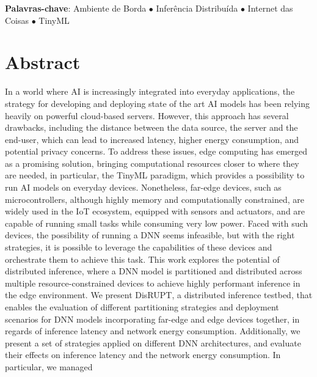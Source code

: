\vspace{\fill}
\begin{flushleft}
{\Large \textbf{Palavras-chave}:} 
Ambiente de Borda \(\bullet\) 
Inferência Distribuída \(\bullet\)
Internet das Coisas \(\bullet\)
TinyML 
\end{flushleft}
\vspace*{24mm}

\acresetall %

\chapter*{Abstract}

In a world where \ac{AI} is increasingly integrated into everyday applications, the 
strategy for developing
and deploying state of the art \ac{AI} models has been relying heavily on powerful 
cloud-based servers. However, this approach has several drawbacks, including the
distance between the data source, the server and the end-user, which can lead to
increased latency, higher energy consumption, and potential privacy concerns.
To address these issues, edge computing has emerged as a promising solution, bringing
computational resources closer to where they are needed, in particular, the TinyML
paradigm, which provides a possibility to run \ac{AI} models on everyday devices.
Nonetheless, far-edge devices, such as microcontrollers, although
highly memory and computationally constrained, are widely used in the \ac{IoT} ecosystem,
equipped with sensors and actuators, and are capable of running small tasks while
consuming very low power. Faced with such devices, the possibility of running a
\ac{DNN} seems infeasible, but with the right strategies, it is possible to leverage
the capabilities of these devices and orchestrate them to achieve this task.
This work explores the potential of distributed inference,
where a \ac{DNN} model is partitioned and distributed across multiple
resource-constrained devices to achieve highly performant inference in the edge 
environment. We present \ac{DisRUPT}, a distributed inference testbed, that enables the
evaluation of different partitioning strategies and deployment scenarios for \ac{DNN} 
models incorporating far-edge and edge devices together, in regards of inference 
latency and network energy consumption. Additionally, we present a set 
of strategies applied on different \ac{DNN} architectures, and evaluate their effects 
on inference latency and the network energy consumption. In particular, we managed
